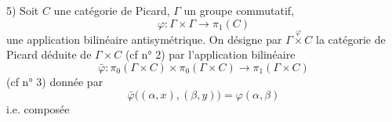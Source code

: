 5) Soit $C$ une catégorie de Picard, $\Gamma$ un groupe commutatif, \deleted{$\varphi$}
\[
\varphi\colon\Gamma\times\Gamma\longrightarrow\pi_1(C)
\]
une application bilinéaire antisymétrique. On désigne par $\Gamma\overset{\varphi}{\times}C$ la catégorie de Picard déduite de $\Gamma\times C$ (cf n° 2) par l'application bilinéaire 
\[
\bar\varphi\colon\pi_0(\Gamma\times C)\times\pi_0(\Gamma\times C)\longrightarrow\pi_1(\Gamma\times C)
\]
(cf n° 3) donnée par
\[
\bar\varphi\big((\alpha,x),(\beta,y)\big)=\varphi(\alpha,\beta)
\]
i.e. composée 

